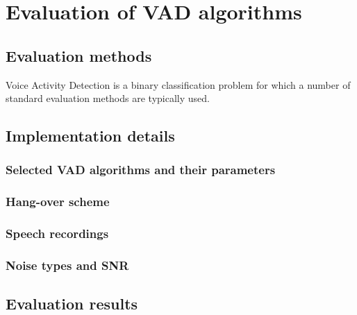
\chapter{Evaluation of VAD algorithms} %

\label{Chapter3} %



\section{Evaluation methods}

Voice Activity Detection is a binary classification problem for which a number of standard evaluation methods are typically used.

\section{Implementation details}

\subsection{Selected VAD algorithms and their parameters}

\subsection{Hang-over scheme}

\subsection{Speech recordings}

\subsection{Noise types and SNR}

\section{Evaluation results}

